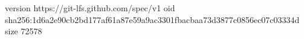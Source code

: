 version https://git-lfs.github.com/spec/v1
oid sha256:1d6a2e90cb2bd177af61a87e59a9ac3301fbacbaa73d3877c0856ec07c03334d
size 72578

